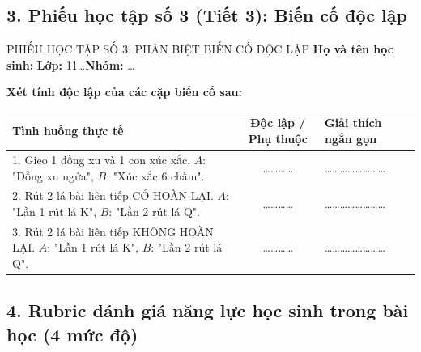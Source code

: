 \documentclass[12pt, a4paper]{article}
\begin{document}
\subsection*{3. Phiếu học tập số 3 (Tiết 3): Biến cố độc lập}

\begin{pedabox}{PHIẾU HỌC TẬP SỐ 3: PHÂN BIỆT BIẾN CỐ ĐỘC LẬP}
    \textbf{Họ và tên học sinh:} \dotfill \textbf{Lớp:} 11\dots \textbf{Nhóm:} \dots

    \textbf{Xét tính độc lập của các cặp biến cố sau:}
    \begin{center}
    \begin{tabular}{|p{7.5cm}|c|p{5cm}|}
    \hline
    \textbf{Tình huống thực tế} & \textbf{Độc lập / Phụ thuộc} & \textbf{Giải thích ngắn gọn} \\ \hline
    1. Gieo 1 đồng xu và 1 con xúc xắc. $A$: "Đồng xu ngửa", $B$: "Xúc xắc 6 chấm". & \dots\dots\dots\dots & \dots\dots\dots\dots\dots\dots\dots\dots \\ \hline
    2. Rút 2 lá bài liên tiếp CÓ HOÀN LẠI. $A$: "Lần 1 rút lá K", $B$: "Lần 2 rút lá Q". & \dots\dots\dots\dots & \dots\dots\dots\dots\dots\dots\dots\dots \\ \hline
    3. Rút 2 lá bài liên tiếp KHÔNG HOÀN LẠI. $A$: "Lần 1 rút lá K", $B$: "Lần 2 rút lá Q". & \dots\dots\dots\dots & \dots\dots\dots\dots\dots\dots\dots\dots \\ \hline
    \end{tabular}
    \end{center}
\end{pedabox}

\subsection*{4. Rubric đánh giá năng lực học sinh trong bài học (4 mức độ)}
\end{document}
